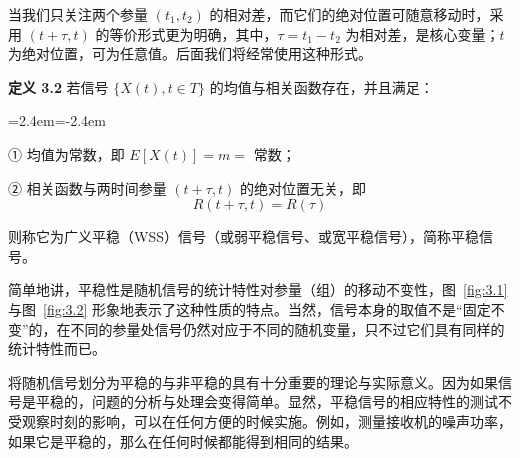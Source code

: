 \documentclass[11pt,openany,UTF8]{ctexbook}
\newcommand{\E}{E}                                 %
\newcommand{\thm}[1]{\par\medskip\noindent\textbf{#1}\quad}
\newenvironment{citemize}
  {\begin{list}{}{\leftmargin=2.4em\itemindent=-2.4em\itemsep=1pt\topsep=3pt\parsep=0pt}}
  {\end{list}}
\newcommand{\fw}[1]{{\xeCJKsetup{CJKecglue={}}（#1\nobreak）}}
\begin{document}
当我们只关注两个参量 $(t_1,t_2)$ 的相对差\nobreak，而它们的绝对位置可随意移动时\nobreak，采用 $(t+\tau,t)$ 的等价形式更为明确\nobreak，其中\nobreak，$\tau=t_1-t_2$ 为相对差\nobreak，是核心变量\nobreak；$t$ 为绝对位置\nobreak，可为任意值\nobreak。后面我们将经常使用这种形式\nobreak。

\thm{定义 3.2} 若信号 $\{X(t),t\in T\}$ 的均值与相关函数存在\nobreak，并且满足\nobreak：
\begin{citemize}
\item ① 均值为常数\nobreak，即 $\E[X(t)]=m=$ 常数\nobreak；
\item ② 相关函数与两时间参量 $(t+\tau,t)$ 的绝对位置无关\nobreak，即
\begin{equation}
R(t+\tau,t)=R(\tau)
\label{eq:3.2}
\end{equation}
\end{citemize}
则称它为广义平稳\fw{WSS}信号（或弱平稳信号\nobreak、或宽平稳信号\nobreak）\nobreak，简称平稳信号\nobreak。

简单地讲\nobreak，平稳性是随机信号的统计特性对参量（组\nobreak）的移动不变性\nobreak，图~\ref{fig:3.1} 与图~\ref{fig:3.2} 形象地表示了这种性质的特点\nobreak。当然\nobreak，信号本身的取值不是“固定不变”的\nobreak，在不同的参量处信号仍然对应于不同的随机变量\nobreak，只不过它们具有同样的统计特性而已\nobreak。

将随机信号划分为平稳的与非平稳的具有十分重要的理论与实际意义\nobreak。因为如果信号是平稳的\nobreak，问题的分析与处理会变得简单\nobreak。显然\nobreak，平稳信号的相应特性的测试不受观察时刻的影响\nobreak，可以在任何方便的时候实施\nobreak。例如\nobreak，测量接收机的噪声功率\nobreak，如果它是平稳的\nobreak，那么在任何时候都能得到相同的结果\nobreak。
\end{document}
